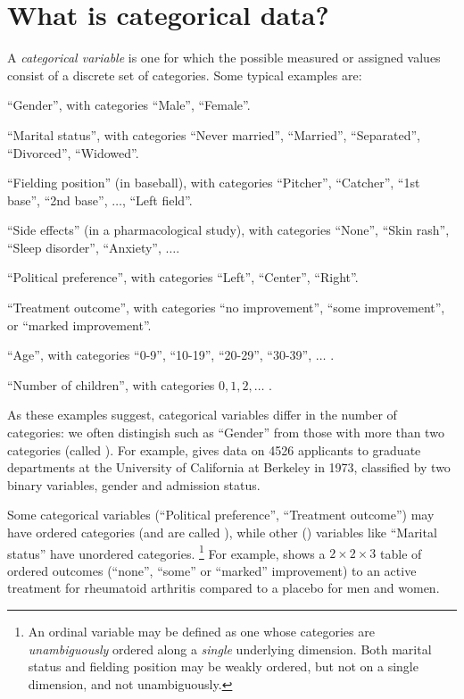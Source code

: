 \section{What is categorical data?}\label{sec:intro-whatis}

A \emph{categorical variable} is one for which the possible measured
or assigned values
consist of a discrete set of categories.
Some typical examples are:
\begin{itemize*}
\item ``Gender'', with categories ``Male'', ``Female''.
\item ``Marital status'', with categories ``Never married'', ``Married'',
``Separated'', ``Divorced'', ``Widowed''.
\item ``Fielding position'' (in baseball), with categories
``Pitcher'', ``Catcher'', ``1st base'', ``2nd base'',  $\dots$, ``Left field''.
\item ``Side effects'' (in a pharmacological study), with categories
``None'', ``Skin rash'', ``Sleep disorder'', ``Anxiety'', $\dots$.
\item ``Political preference'', with categories ``Left'', ``Center'', ``Right''.
\item ``Treatment outcome'', with categories ``no improvement'', ``some
improvement'', or ``marked improvement''.
\item ``Age'', with categories ``0-9'', ``10-19'', ``20-29'', ``30-39'', 
$\dots$ .
\item ``Number of children'', with categories $0, 1, 2, \dots$ .
\end{itemize*}

As these examples suggest, categorical variables differ in the number of
categories: we often distingish 
 such as ``Gender''
from those with more than two categories (called ).
For example,  gives data on 4526 applicants
to graduate departments at the University of California at Berkeley
in 1973, classified by two binary variables, gender and admission status.


Some categorical variables (``Political preference'', ``Treatment outcome'')
may have ordered categories (and are called ),
while other () variables like ``Marital status''
have unordered categories.%
\footnote{An ordinal variable may be defined as one whose categories are
\emph{unambiguously} ordered along a \emph{single} underlying dimension.
Both marital status and fielding position may be weakly ordered, but
not on a single dimension, and not unambiguously.} 
For example,  shows a $2 \times 2 \times 3$ table of 
ordered outcomes (``none'', ``some'' or ``marked'' improvement)
to an active treatment for rheumatoid
arthritis compared to a placebo for men and women.


